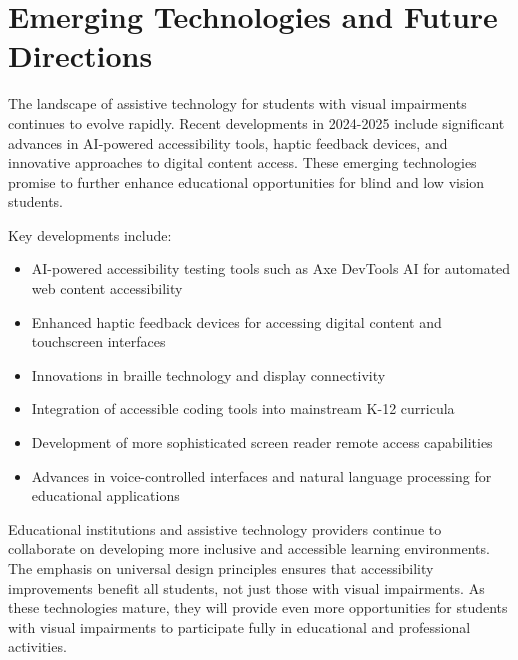 \section{Emerging Technologies and Future Directions}\label{appx12}

The landscape of assistive technology for students with visual impairments continues to evolve rapidly. Recent developments in 2024-2025 include significant advances in AI-powered accessibility tools, haptic feedback devices, and innovative approaches to digital content access. These emerging technologies promise to further enhance educational opportunities for blind and low vision students.

Key developments include:
\begin{itemize}
  \item AI-powered accessibility testing tools such as Axe DevTools AI for automated web content accessibility
  \item Enhanced haptic feedback devices for accessing digital content and touchscreen interfaces
  \item Innovations in braille technology and display connectivity
  \item Integration of accessible coding tools into mainstream K-12 curricula
  \item Development of more sophisticated screen reader remote access capabilities
  \item Advances in voice-controlled interfaces and natural language processing for educational applications
 \end{itemize}

Educational institutions and assistive technology providers continue to collaborate on developing more inclusive and accessible learning environments. The emphasis on universal design principles ensures that accessibility improvements benefit all students, not just those with visual impairments. As these technologies mature, they will provide even more opportunities for students with visual impairments to participate fully in educational and professional activities.


